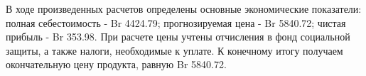 В ходе произведенных расчетов определены основные экономические показатели:
полная себестоимость - Br 4424.79;
прогнозируемая цена - Br 5840.72;
чистая прибыль - Br 353.98.
При расчете цены учтены отчисления в фонд социальной защиты, а также налоги, необходимые к уплате.
К конечному итогу получаем окончательную цену продукта, равную Br 5840.72. 
